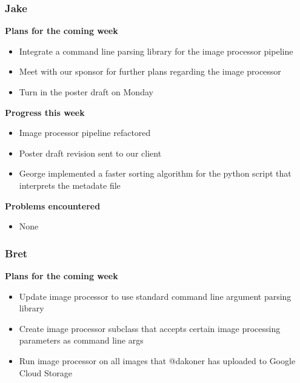\documentclass[10pt, onecolumn, draftclsnofoot, letterpaper, compsoc]{IEEEtran}
\begin{document}
    \subsubsection{Jake}

    \noindent \textbf{Plans for the coming week}

    \begin{itemize}

    \item Integrate a command line parsing library for the image processor pipeline
    \item Meet with our sponsor for further plans regarding the image processor
    \item Turn in the poster draft on Monday

    \end{itemize}

    \noindent \textbf{Progress this week}

    \begin{itemize}

    \item Image processor pipeline refactored
    \item Poster draft revision sent to our client
    \item George implemented a faster sorting algorithm for the python script that interprets the metadate file

    \end{itemize}

    \noindent \textbf{Problems encountered}

    \begin{itemize}

    \item None

    \end{itemize}

    \subsubsection{Bret}

    \noindent \textbf{Plans for the coming week}

    \begin{itemize}

    \item Update image processor to use standard command line argument parsing library
    \item Create image processor subclass that accepts certain image processing parameters as command line args
    \item Run image processor on all images that @dakoner has uploaded to Google Cloud Storage

    \end{itemize}
\end{document}
